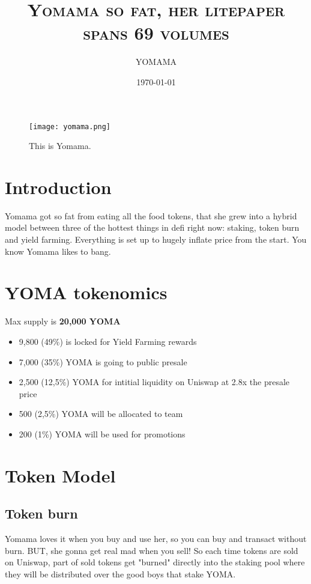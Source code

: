 \documentclass[11pt]{scrartcl} %
\title{	
	\normalfont\normalsize
	\textsc{Yomama so fat, her litepaper spans 69 volumes}\\ 
}
\author{\LARGE YOMAMA} %
\date{\normalsize\today} %
\begin{document}
\maketitle %

\begin{figure}[h] %
	\centering
	\texttt{[image: yomama.png]} %
	\caption{This is Yomama.}
\end{figure}


\section{Introduction}

Yomama got so fat from eating all the food tokens, that she grew into a hybrid model between three of the hottest things in defi right now: staking, token burn and yield farming. Everything is set up to hugely inflate price from the start. You know Yomama likes to bang.

\section{YOMA tokenomics}

Max supply is \textbf{20,000 YOMA}
\begin{itemize}
	\item 9,800 (49\%) is locked for Yield Farming rewards
	\item 7,000 (35\%) YOMA is going to public presale
	\item 2,500 (12,5\%) YOMA for intitial liquidity on Uniswap at 2.8x the presale price
	\item 500 (2,5\%) YOMA will be allocated to team
	\item 200 (1\%) YOMA will be used for promotions
\end{itemize}

\section{Token Model}

\subsection{Token burn}

Yomama loves it when you buy and use her, so you can buy and transact without burn. BUT, she gonna get real mad when you sell! So each time tokens are sold on Uniswap, part of sold tokens get "burned" directly into the staking pool where they will be distributed over the good boys that stake YOMA.
\end{document}

